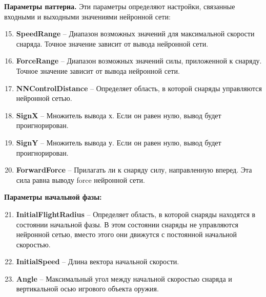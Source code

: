 \vspace{5mm}

\textbf{Параметры паттерна.} Эти параметры определяют настройки, связанные входными и выходными значениями нейронной сети:
\begin{enumerate}
    \setcounter{enumi}{14}
    \item {\small \textbf{SpeedRange}} -- Диапазон возможных значений для максимальной скорости снаряда. Точное значение зависит от вывода нейронной сети.
    \item {\small \textbf{ForceRange}} -- Диапазон возможных значений силы, приложенной к снаряду. Точное значение зависит от вывода нейронной сети.
    \item {\small \textbf{NNControlDistance}} -- Определяет область, в которой снаряды управляются нейронной сетью.
    \item {\small \textbf{SignX}} -- Множитель вывода х. Если он равен нулю, вывод будет проигнорирован.
    \item {\small \textbf{SignY}} -- Множитель вывода у. Если он равен нулю, вывод будет проигнорирован.
    \item {\small \textbf{ForwardForce}} -- Прилагать ли к снаряду силу, направленную вперед. Эта сила равна выводу force нейронной сети.
\end{enumerate}

\vspace{5mm}

\textbf{Параметры начальной фазы:}
\begin{enumerate}
    \setcounter{enumi}{20}
    \item {\small \textbf{InitialFlightRadius}} -- Определяет область, в которой снаряды находятся в состоянии начальной фазы. В этом состоянии снаряды не управляются нейронной сетью, вместо этого они движутся с постоянной начальной скоростью.
    \item {\small \textbf{InitialSpeed}} -- Длина вектора начальной скорости.
    \item {\small \textbf{Angle}} -- Максимальный угол между начальной скоростью снаряда и вертикальной осью игрового объекта оружия.
\end{enumerate}

\vspace{5mm}

